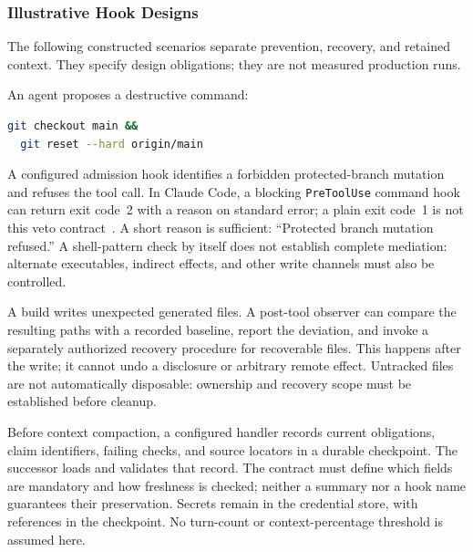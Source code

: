 \documentclass[11pt,a4paper]{article}
\begin{document}
\subsubsection{Illustrative Hook Designs}
\label{sec:lifecycle-hook-cases}
The following constructed scenarios separate prevention, recovery, and retained
context. They specify design obligations; they are not measured production runs.

\begin{description}[leftmargin=1.5em,style=sameline,font=\normalfont]
\item[\textbf{Case A: Pre-tool refusal.}]
An agent proposes a destructive command:
\begin{lstlisting}[language=bash,basicstyle=\ttfamily\small,breaklines=true]
git checkout main &&
  git reset --hard origin/main
\end{lstlisting}
A configured admission hook identifies a forbidden protected-branch mutation
and refuses the tool call. In Claude Code, a blocking \texttt{PreToolUse}
command hook can return exit code~2 with a reason on standard error; a plain
exit code~1 is not this veto contract~. A short
reason is sufficient: ``Protected branch mutation refused.'' A shell-pattern
check by itself does not establish complete mediation: alternate executables,
indirect effects, and other write channels must also be controlled.

\item[\textbf{Case B: Post-tool recovery.}]
A build writes unexpected generated files. A post-tool observer can compare
the resulting paths with a recorded baseline, report the deviation, and invoke
a separately authorized recovery procedure for recoverable files. This happens
after the write; it cannot undo a disclosure or arbitrary remote effect.
Untracked files are not automatically disposable: ownership and recovery
scope must be established before cleanup.

\item[\textbf{Case C: Compaction preparation.}]
Before context compaction, a configured handler records current obligations,
claim identifiers, failing checks, and source locators in a durable checkpoint.
The successor loads and validates that record. The contract must define which
fields are mandatory and how freshness is checked; neither a summary nor a
hook name guarantees their preservation. Secrets remain in the credential
store, with references in the checkpoint. No turn-count or context-percentage
threshold is assumed here.
\end{description}
\end{document}
